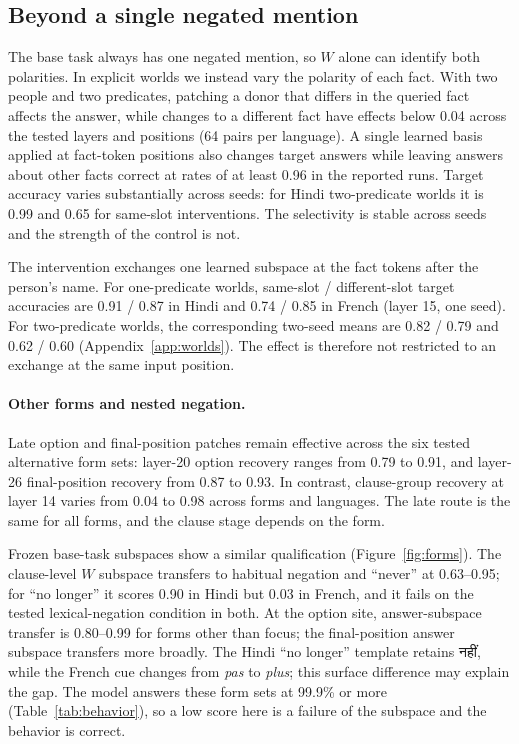 \documentclass[11pt]{article}
\newcommand{\hi}[1]{{\hindifont #1}}
\begin{document}
\subsection{Beyond a single negated mention}
\label{sec:generalization}
The base task always has one negated mention, so $W$ alone can identify both polarities. In explicit worlds we instead vary the polarity of each fact. With two people and two predicates, patching a donor that differs in the queried fact affects the answer, while changes to a different fact have effects below 0.04 across the tested layers and positions (64 pairs per language). A single learned basis applied at fact-token positions also changes target answers while leaving answers about other facts correct at rates of at least 0.96 in the reported runs. Target accuracy varies substantially across seeds: for Hindi two-predicate worlds it is 0.99 and 0.65 for same-slot interventions. The selectivity is stable across seeds and the strength of the control is not.

The intervention exchanges one learned subspace at the fact tokens after the person's name. For one-predicate worlds, same-slot / different-slot target accuracies are 0.91 / 0.87 in Hindi and 0.74 / 0.85 in French (layer 15, one seed). For two-predicate worlds, the corresponding two-seed means are 0.82 / 0.79 and 0.62 / 0.60 (Appendix~\ref{app:worlds}). The effect is therefore not restricted to an exchange at the same input position.

\paragraph{Other forms and nested negation.} Late option and final-position patches remain effective across the six tested alternative form sets: layer-20 option recovery ranges from 0.79 to 0.91, and layer-26 final-position recovery from 0.87 to 0.93. In contrast, clause-group recovery at layer 14 varies from 0.04 to 0.98 across forms and languages. The late route is the same for all forms, and the clause stage depends on the form.

Frozen base-task subspaces show a similar qualification (Figure~\ref{fig:forms}). The clause-level $W$ subspace transfers to habitual negation and ``never'' at 0.63--0.95; for ``no longer'' it scores 0.90 in Hindi but 0.03 in French, and it fails on the tested lexical-negation condition in both. At the option site, answer-subspace transfer is 0.80--0.99 for forms other than focus; the final-position answer subspace transfers more broadly. The Hindi ``no longer'' template retains \hi{नहीं}, while the French cue changes from \emph{pas} to \emph{plus}; this surface difference may explain the gap. The model answers these form sets at 99.9\% or more (Table~\ref{tab:behavior}), so a low score here is a failure of the subspace and the behavior is correct.
\end{document}
